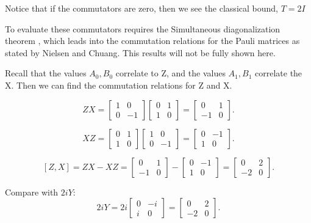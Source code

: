 \documentclass[12pt]{article}
\begin{document}
Notice that if the commutators are zero, then we see the classical bound, $T = 2I$

To evaluate these commutators requires the Simultaneous diagonalization theorem \cite{Quantum_Information}, which leads into the commutation relations for the Pauli matrices as stated by Nielsen and Chuang. This results will not be fully shown here.  

Recall that the values $A_0, B_0$ correlate to Z, and the values $A_1, B_1$ correlate the X. Then we can find the commutation relations for Z and X.

$$  
ZX = \begin{bmatrix} 1 & 0 \\ 0 & -1 \end{bmatrix} \begin{bmatrix} 0 & 1 \\ 1 & 0 \end{bmatrix} = \begin{bmatrix} 0 & 1 \\ -1 & 0 \end{bmatrix}.  
$$  

$$  
XZ = \begin{bmatrix} 0 & 1 \\ 1 & 0 \end{bmatrix} \begin{bmatrix} 1 & 0 \\ 0 & -1 \end{bmatrix} = \begin{bmatrix} 0 & -1 \\ 1 & 0 \end{bmatrix}.  
$$  

$$  
[Z, X] = ZX - XZ = \begin{bmatrix} 0 & 1 \\ -1 & 0 \end{bmatrix} - \begin{bmatrix} 0 & -1 \\ 1 & 0 \end{bmatrix} = \begin{bmatrix} 0 & 2 \\ -2 & 0 \end{bmatrix}.  
$$  

Compare with $2iY$:  
$$  
2iY = 2i \begin{bmatrix} 0 & -i \\ i & 0 \end{bmatrix} = \begin{bmatrix} 0 & 2 \\ -2 & 0 \end{bmatrix}.  
$$  
\end{document}
